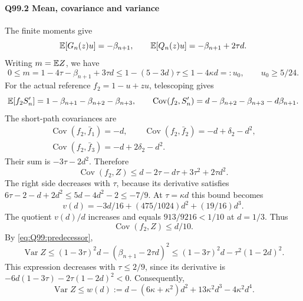 \paragraph{Q99.2 Mean, covariance and variance}\label{part:Q99.2}
The finite moments give
\[
 \mathbb E[G_n(z)u]=-\beta_{n+1},\qquad
 \mathbb E[Q_n(z)u]=-\beta_{n+1}+2\tau d.
\]
Writing $m=\allowbreak \mathbb E Z$, we have
\begin{equation}\tag{Q99.2.1}\label{eq:Q99:mean}
 0\le m=1-4\tau-\beta_{n+1}+3\tau d
 \le1-(5-3d)\tau\le1-4\kappa d=:u_0,
 \qquad u_0\ge5/24.
\end{equation}
For the actual reference $f_2=\allowbreak 1-u+zu$, telescoping gives
\[
 \mathbb E[f_2S'_n]=1-\beta_{n+1}-\beta_{n+2}-\beta_{n+3},\qquad
 \operatorname{Cov}(f_2,S'_n)
 =d-\beta_{n+2}-\beta_{n+3}-d\beta_{n+1}.
\]
The short-path covariances are
\[
 \begin{gathered}
 \operatorname{Cov}(f_2,\bar f_1)=-d,\qquad
 \operatorname{Cov}(f_2,\bar f_2)=-d+\delta_2-d^2,\\
 \operatorname{Cov}(f_2,\bar f_3)=-d+2\delta_2-d^2.
 \end{gathered}
\]
Their sum is $-3\tau-2d^2$. Therefore
\[
 \operatorname{Cov}(f_2,Z)
 \le d-2\tau-d\tau+3\tau^2+2\tau d^2.
\]
The right side decreases with $\tau$, because its derivative satisfies
$6\tau-2-d+2d^2\le\allowbreak 5d-4d^2-2\le\allowbreak -7/9$.
At $\tau=\allowbreak \kappa d$ this bound becomes
\[
 v(d)=-3d/16+(475/1024)d^2+(19/16)d^3.
\]
The quotient $v(d)/d$ increases and equals $913/9216<\allowbreak 1/10$ at
$d=\allowbreak 1/3$. Thus
\begin{equation}\tag{Q99.2.2}\label{eq:Q99:covariance}
 \operatorname{Cov}(f_2,Z)\le d/10.
\end{equation}
By \eqref{eq:Q99:predecessor},
\[
 \operatorname{Var}Z\le(1-3\tau)^2d-(\beta_{n+1}-2\tau d)^2
 \le(1-3\tau)^2d-\tau^2(1-2d)^2.
\]
This expression decreases with $\tau\le\allowbreak 2/9$, since its derivative is
$-6d(1-3\tau)-2\tau(1-2d)^2<\allowbreak 0$. Consequently,
\begin{equation}\tag{Q99.2.3}\label{eq:Q99:variance}
 \operatorname{Var}Z\le
 w(d):=d-(6\kappa+\kappa^2)d^2+13\kappa^2d^3-4\kappa^2d^4.
\end{equation}

